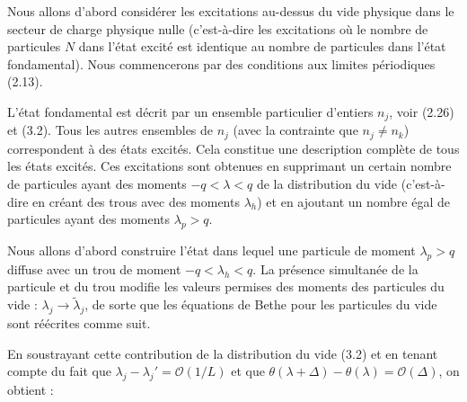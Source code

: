 Nous allons d'abord considérer les excitations au-dessus du vide physique dans le secteur de charge physique nulle (c'est-à-dire les excitations où le nombre de particules \( N \) dans l'état excité est identique au nombre de particules dans l'état fondamental). Nous commencerons par des conditions aux limites périodiques (2.13).

L'état fondamental est décrit par un ensemble particulier d'entiers \( n_j \), voir (2.26) et (3.2). Tous les autres ensembles de \( n_j \) (avec la contrainte que \( n_j \neq n_k \)) correspondent à des états excités. Cela constitue une description complète de tous les états excités. Ces excitations sont obtenues en supprimant un certain nombre de particules ayant des moments \( -q < \lambda < q \) de la distribution du vide (c'est-à-dire en créant des trous avec des moments \( \lambda_h \)) et en ajoutant un nombre égal de particules ayant des moments \( \lambda_p > q \).

Nous allons d'abord construire l'état dans lequel une particule de moment \( \lambda_p > q \) diffuse avec un trou de moment \( -q < \lambda_h < q \). La présence simultanée de la particule et du trou modifie les valeurs permises des moments des particules du vide : \( \lambda_j \to \tilde{\lambda}_j \), de sorte que les équations de Bethe pour les particules du vide sont réécrites comme suit.

En soustrayant cette contribution de la distribution du vide (3.2) et en tenant compte du fait que \( \lambda_j - \lambda_j' = \mathcal{O}(1/L) \) et que \( \theta( \lambda + \Delta) - \theta(\lambda) = \mathcal{O}(\Delta) \), on obtient :

